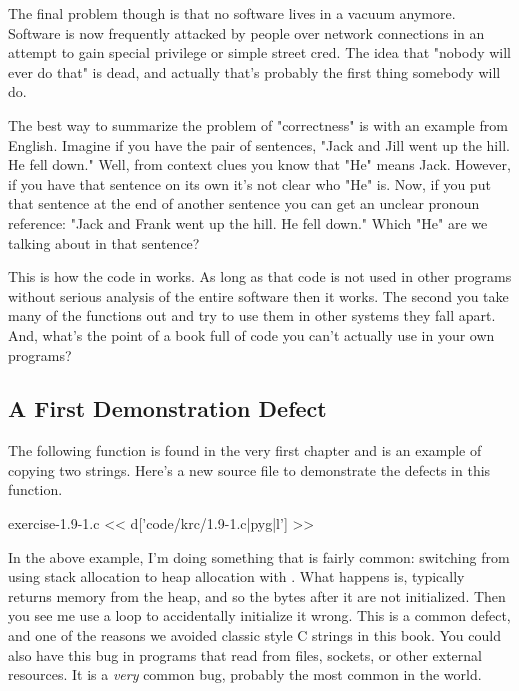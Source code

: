 The final problem though is that no software lives in a vacuum anymore. Software
is now frequently attacked by people over network connections in an attempt to
gain special privilege or simple street cred.  The idea that "nobody will ever do
that" is dead, and actually that's probably the first thing somebody will do.

The best way to summarize the problem of \krc "correctness" is with an example
from English.  Imagine if you have the pair of sentences, "Jack and Jill went up the hill.
He fell down."  Well, from context clues you know that "He" means Jack.  However,
if you have that sentence on its own it's not clear who "He" is.  Now, if you put
that sentence at the end of another sentence you can get an unclear
pronoun reference: "Jack and Frank went up the hill. He fell down."  Which "He"
are we talking about in that sentence?

This is how the code in \krc works.  As long as that code is not used in other
programs without serious analysis of the entire software then it works.  The second
you take many of the functions out and try to use them in other systems they
fall apart.  And, what's the point of a book full of code you can't actually
use in your own programs?


\subsection{A First Demonstration Defect}

The following  function is found in the very first chapter and is
an example of copying two strings.  Here's a new source file to demonstrate the
defects in this function.

\begin{code}{exercise-1.9-1.c}
<< d['code/krc/1.9-1.c|pyg|l'] >>
\end{code}

In the above example, I'm doing something that is fairly common: switching from
using stack allocation to heap allocation with .  What happens
is, typically  returns memory from the heap, and so the bytes
after it are not initialized.  Then you see me use a loop to accidentally
initialize it wrong.  This is a common defect, and one of the reasons we
avoided classic style C strings in this book.  You could also have this bug in
programs that read from files, sockets, or other external resources.  It is a
\emph{very} common bug, probably the most common in the world.

